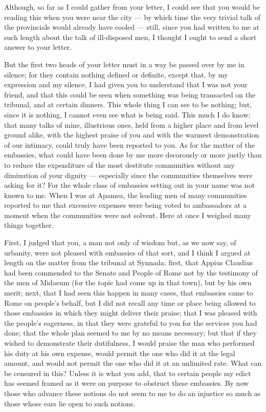 

 Although, so far as I could gather from your letter, I could see that you would be reading this when you were near the city --- by which time the very trivial talk of the provincials would already have cooled --- still, since you had written to me at such length about the talk of ill-disposed men, I thought I ought to send a short answer to your letter.

 But the first two heads of your letter must in a way be passed over by me in silence; for they contain nothing defined or definite, except that, by my expression and my silence, I had given you to understand that I was not your friend, and that this could be seen when something was being transacted on the tribunal, and at certain dinners. This whole thing I can see to be nothing; but, since it is nothing, I cannot even see what is being said. This much I do know: that many talks of mine, illustrious ones, held from a higher place and from level ground alike, with the highest praise of you and with the warmest demonstration of our intimacy, could truly have been reported to you. As for the matter of the embassies, what could have been done by me more decorously or more justly than to reduce the expenditure of the most destitute communities without any diminution of your dignity --- especially since the communities themselves were asking for it? For the whole class of embassies setting out in your name was not known to me. When I was at Apamea, the leading men of many communities reported to me that excessive expenses were being voted to ambassadors at a moment when the communities were not solvent. Here at once I weighed many things together.

 First, I judged that you, a man not only of wisdom but, as we now say, of urbanity, were not pleased with embassies of that sort, and I think I argued at length on the matter from the tribunal at Synnada: first, that Appius Claudius had been commended to the Senate and People of Rome not by the testimony of the men of Midaeum (for the topic had come up in that town), but by his own merit; next, that I had seen this happen in many cases, that embassies came to Rome on people's behalf, but I did not recall any time or place being allowed to those embassies in which they might deliver their praise; that I was pleased with the people's eagerness, in that they were grateful to you for the services you had done; that the whole plan seemed to me by no means necessary; but that if they wished to demonstrate their dutifulness, I would praise the man who performed his duty at his own expense, would permit the one who did it at the legal amount, and would not permit the one who did it at an unlimited rate. What can be censured in this? Unless it is what you add, that to certain people my edict has seemed framed as it were on purpose to obstruct these embassies. By now those who advance these notions do not seem to me to do an injustice so much as those whose ears lie open to such notions.

